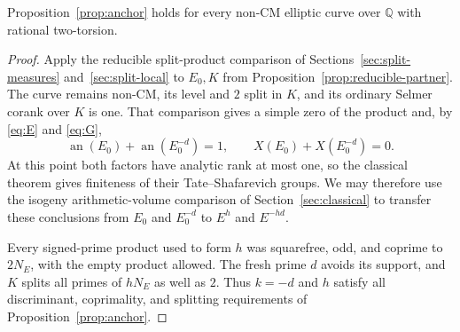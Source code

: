 \begin{corollary}\label{cor:reducible-anchor}
Proposition~\ref{prop:anchor} holds for every non-CM elliptic curve over
\(\mathbb Q\) with rational two-torsion.
\end{corollary}

\begin{proof}
Apply the reducible split-product comparison of
Sections~\ref{sec:split-measures} and~\ref{sec:split-local} to \(E_0,K\)
from Proposition~\ref{prop:reducible-partner}.  The curve remains non-CM,
its level and \(2\) split in \(K\), and its ordinary Selmer corank over
\(K\) is one.  That comparison gives a simple zero of the product and,
by \eqref{eq:E} and \eqref{eq:G},
\[
 \operatorname{an}(E_0)+\operatorname{an}(E_0^{-d})=1,
 \qquad X(E_0)+X(E_0^{-d})=0.
\]
At this point both factors have analytic rank at most one, so the
classical theorem gives finiteness of their Tate--Shafarevich groups.
We may therefore use the isogeny arithmetic-volume comparison of
Section~\ref{sec:classical} to transfer these conclusions from \(E_0\)
and \(E_0^{-d}\) to \(E^h\) and \(E^{-hd}\).

Every signed-prime product used to form \(h\) was squarefree, odd, and
coprime to \(2N_E\), with the empty product allowed.  The fresh prime
\(d\) avoids its support, and \(K\) splits all primes of \(hN_E\) as
well as \(2\).  Thus \(k=-d\) and \(h\) satisfy all discriminant,
coprimality, and splitting requirements of Proposition~\ref{prop:anchor}.
\end{proof}
